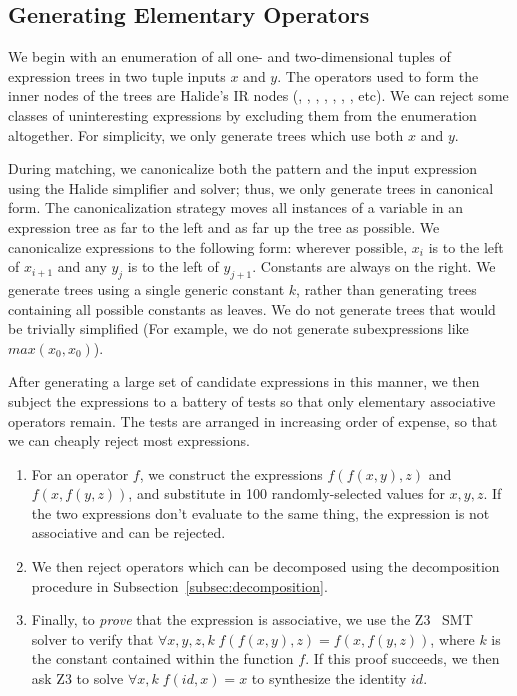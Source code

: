 \subsection{Generating Elementary Operators}
\label{subsec:generation}

We begin with an enumeration of all one- and two-dimensional tuples of expression trees in two tuple inputs $x$ and $y$. The operators used to form the inner nodes of the trees are Halide's IR nodes (\code{*}, \code{+}, \code{-}, , , , \code{<}, etc). We can reject some classes of uninteresting expressions by excluding them from the enumeration altogether. For simplicity, we only generate trees which use both $x$ and $y$.

 During matching, we canonicalize both the pattern and the input expression using the Halide simplifier and solver; thus, we only generate trees in canonical form.  The canonicalization strategy moves all instances of a variable in an expression tree as far to the left and as far up the tree as possible. We canonicalize expressions to the following form: wherever possible, $x_i$ is to the left of $x_{i+1}$ and any $y_j$ is to the left of $y_{j+1}$. Constants are always on the right. We generate trees using a single generic constant $k$, rather than generating trees containing all possible constants as leaves. We do not generate trees that would be trivially simplified (For example, we do not generate subexpressions like $max(x_0, x_0)$).

After generating a large set of candidate expressions in this manner, we then subject the expressions to a battery of tests so that only elementary associative operators remain. The tests are arranged in increasing order of expense, so that we can cheaply reject most expressions.

\begin{enumerate}
\item For an operator $f$, we construct the expressions $f(f(x, y), z)$ and $f(x, f(y, z))$, and substitute in 100 randomly-selected values for $x, y, z$. If the two expressions don't evaluate to the same thing, the expression is not associative and can be rejected.
\item We then reject operators which can be decomposed using the decomposition procedure in Subsection~\ref{subsec:decomposition}.
\item Finally, to \emph{prove} that the expression is associative, we use the Z3~\cite{DeMoura:2008:ZES:1792734.1792766} SMT solver to verify that $\forall x, y, z, k \;f(f(x, y), z) = f(x, f(y, z))$, where $k$ is the constant contained within the function $f$. If this proof succeeds, we then ask Z3 to solve $\forall x, k \;f(id, x) = x$ to synthesize the identity $id$.
\end{enumerate}

